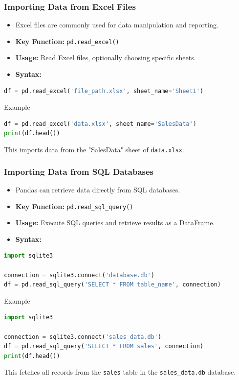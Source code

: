 \documentclass{beamer}
\begin{document}
\begin{frame}[fragile]
    \frametitle{Importing Data from Excel Files}

    \begin{itemize}
        \item Excel files are commonly used for data manipulation and reporting.
        \item \textbf{Key Function:} \texttt{pd.read\_excel()}
        \item \textbf{Usage:} Read Excel files, optionally choosing specific sheets.
        \item \textbf{Syntax:}
    \end{itemize}
    
    \begin{lstlisting}[language=Python]
df = pd.read_excel('file_path.xlsx', sheet_name='Sheet1')
    \end{lstlisting}
    
    \begin{block}{Example}
        \begin{lstlisting}[language=Python]
df = pd.read_excel('data.xlsx', sheet_name='SalesData')
print(df.head())
        \end{lstlisting}
        This imports data from the "SalesData" sheet of \texttt{data.xlsx}.
    \end{block}
\end{frame}

\begin{frame}[fragile]
    \frametitle{Importing Data from SQL Databases}

    \begin{itemize}
        \item Pandas can retrieve data directly from SQL databases.
        \item \textbf{Key Function:} \texttt{pd.read\_sql\_query()}
        \item \textbf{Usage:} Execute SQL queries and retrieve results as a DataFrame.
        \item \textbf{Syntax:}
    \end{itemize}

    \begin{lstlisting}[language=Python]
import sqlite3

connection = sqlite3.connect('database.db')
df = pd.read_sql_query('SELECT * FROM table_name', connection)
    \end{lstlisting}

    \begin{block}{Example}
        \begin{lstlisting}[language=Python]
import sqlite3

connection = sqlite3.connect('sales_data.db')
df = pd.read_sql_query('SELECT * FROM sales', connection)
print(df.head())
        \end{lstlisting}
        This fetches all records from the \texttt{sales} table in the \texttt{sales\_data.db} database.
    \end{block}
\end{frame}
\end{document}

